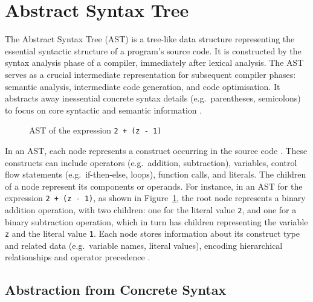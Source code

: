 \section{Abstract Syntax Tree}

The Abstract Syntax Tree (AST) is a tree-like data structure representing the essential syntactic structure of a program's source code. It is constructed by the syntax analysis phase of a compiler, immediately after lexical analysis. The AST serves as a crucial intermediate representation for subsequent compiler phases: semantic analysis, intermediate code generation, and code optimisation. It abstracts away inessential concrete syntax details (e.g.\ parentheses, semicolons) to focus on core syntactic and semantic information \cite{aho2007compilers}.

\begin{figure}[hb!]
    \centering
    \caption{AST of the expression \texttt{2 + (z - 1)}}
    \label{fig:ast-example}
\end{figure}

In an AST, each node represents a construct occurring in the source code \cite{aho2007compilers}. These constructs can include operators (e.g.\ addition, subtraction), variables, control flow statements (e.g.\ if-then-else, loops), function calls, and literals. The children of a node represent its components or operands. For instance, in an AST for the expression \texttt{2 + (z - 1)}, as shown in Figure~\ref{fig:ast-example}, the root node represents a binary addition operation, with two children: one for the literal value \texttt{2}, and one for a binary subtraction operation, which in turn has children representing the variable \texttt{z} and the literal value \texttt{1}. Each node stores information about its construct type and related data (e.g.\ variable names, literal values), encoding hierarchical relationships and operator precedence \cite{aho2007compilers}.

\subsection{Abstraction from Concrete Syntax}

